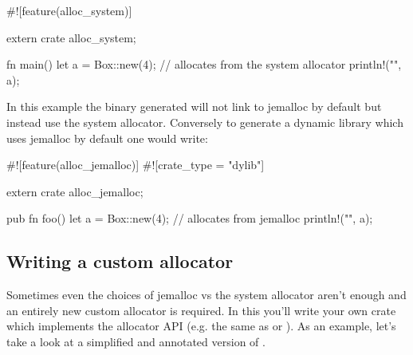 \begin{rustc}
#![feature(alloc_system)]

extern crate alloc_system;

fn main() {
    let a = Box::new(4); // allocates from the system allocator
    println!("{}", a);
}
\end{rustc}

In this example the binary generated will not link to jemalloc by default but instead use the system allocator. Conversely 
to generate a dynamic library which uses jemalloc by default one would write:

\begin{rustc}
#![feature(alloc_jemalloc)]
#![crate_type = "dylib"]

extern crate alloc_jemalloc;

pub fn foo() {
    let a = Box::new(4); // allocates from jemalloc
    println!("{}", a);
}
\end{rustc}

\subsection*{Writing a custom allocator}

Sometimes even the choices of jemalloc vs the system allocator aren't enough and an entirely new custom allocator is required. 
In this you'll write your own crate which implements the allocator API (e.g. the same as  or 
). As an example, let's take a look at a simplified and annotated version of .


